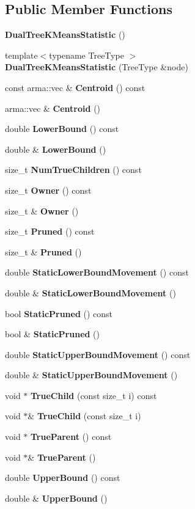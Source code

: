 \subsection*{Public Member Functions}
\begin{DoxyCompactItemize}
\item 
{\bf Dual\+Tree\+K\+Means\+Statistic} ()
\item 
{\footnotesize template$<$typename Tree\+Type $>$ }\\{\bf Dual\+Tree\+K\+Means\+Statistic} (Tree\+Type \&node)
\item 
const arma\+::vec \& {\bf Centroid} () const 
\item 
arma\+::vec \& {\bf Centroid} ()
\item 
double {\bf Lower\+Bound} () const 
\item 
double \& {\bf Lower\+Bound} ()
\item 
size\+\_\+t {\bf Num\+True\+Children} () const 
\item 
size\+\_\+t {\bf Owner} () const 
\item 
size\+\_\+t \& {\bf Owner} ()
\item 
size\+\_\+t {\bf Pruned} () const 
\item 
size\+\_\+t \& {\bf Pruned} ()
\item 
double {\bf Static\+Lower\+Bound\+Movement} () const 
\item 
double \& {\bf Static\+Lower\+Bound\+Movement} ()
\item 
bool {\bf Static\+Pruned} () const 
\item 
bool \& {\bf Static\+Pruned} ()
\item 
double {\bf Static\+Upper\+Bound\+Movement} () const 
\item 
double \& {\bf Static\+Upper\+Bound\+Movement} ()
\item 
void $\ast$ {\bf True\+Child} (const size\+\_\+t i) const 
\item 
void $\ast$\& {\bf True\+Child} (const size\+\_\+t i)
\item 
void $\ast$ {\bf True\+Parent} () const 
\item 
void $\ast$\& {\bf True\+Parent} ()
\item 
double {\bf Upper\+Bound} () const 
\item 
double \& {\bf Upper\+Bound} ()
\end{DoxyCompactItemize}
